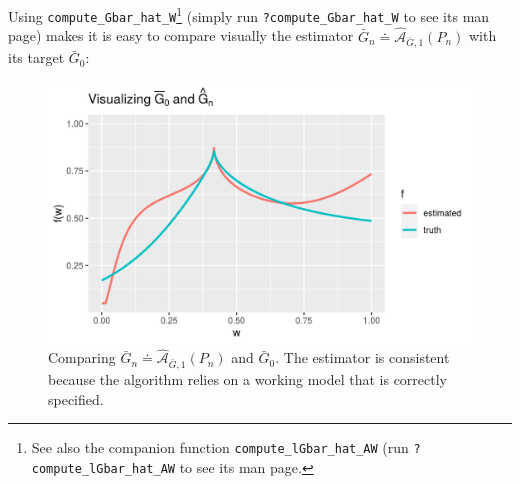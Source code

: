 \documentclass[11pt,openright,twoside]{book}
\newenvironment{Shaded}{\begin{snugshade}}{\end{snugshade}}
\newcommand{\DataTypeTok}[1]{\textcolor[rgb]{0.13,0.29,0.53}{#1}}
\newcommand{\DecValTok}[1]{\textcolor[rgb]{0.00,0.00,0.81}{#1}}
\newcommand{\FloatTok}[1]{\textcolor[rgb]{0.00,0.00,0.81}{#1}}
\newcommand{\KeywordTok}[1]{\textcolor[rgb]{0.13,0.29,0.53}{\textbf{#1}}}
\newcommand{\NormalTok}[1]{#1}
\newcommand{\OperatorTok}[1]{\textcolor[rgb]{0.81,0.36,0.00}{\textbf{#1}}}
\newcommand{\OtherTok}[1]{\textcolor[rgb]{0.56,0.35,0.01}{#1}}
\newcommand{\StringTok}[1]{\textcolor[rgb]{0.31,0.60,0.02}{#1}}
\newcommand{\Algo}{\widehat{\mathcal{A}}}
\newcommand{\defq}{\doteq}
\newcommand{\Gbar}{\bar{G}}
\theoremstyle{definition}
\theoremstyle{definition}
\theoremstyle{definition}
\theoremstyle{remark}
\begin{document}
Using \texttt{compute\_Gbar\_hat\_W}\footnote{See also the companion function
  \texttt{compute\_lGbar\_hat\_AW} (run \texttt{?compute\_lGbar\_hat\_AW} to see its man page.}
(simply run \texttt{?compute\_Gbar\_hat\_W} to see its man page) makes it is easy to
compare visually the estimator \(\Gbar_{n} \defq \Algo_{\Gbar,1}(P_{n})\) with
its target \(\Gbar_0\):



\begin{Shaded}
\end{Shaded}

\begin{figure}

{\centering \includegraphics[width=0.7\linewidth]{img/estimate-Gbar-three-1} 

}

\caption{Comparing \(\Gbar_{n}\defq \Algo_{\Gbar,1}(P_{n})\) and \(\Gbar_{0}\). The estimator is consistent because the algorithm relies on a working model that is correctly specified.}\label{fig:estimate-Gbar-three}
\end{figure}
\end{document}
